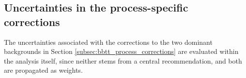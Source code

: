 



\subsection{Uncertainties in the process-specific corrections}
%
The uncertainties associated with the corrections to the two dominant backgrounds in Section \ref{subsec:bbtt_process_corrections} are evaluated within the analysis itself, since neither stems from a central recommendation, and both are propagated as weights.

